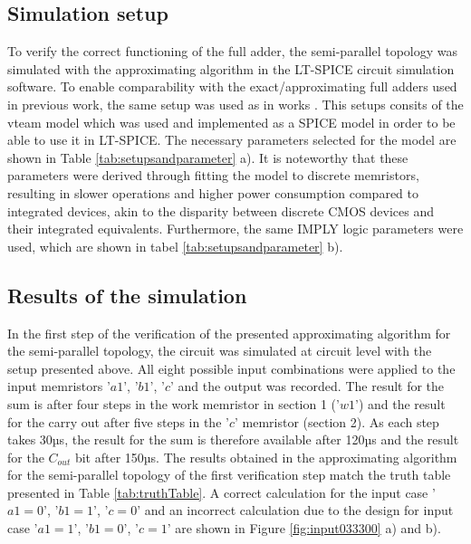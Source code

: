 \documentclass[]{IEEEtran}
\begin{document}
\subsection{Simulation setup}
To verify the correct functioning of the full adder, the semi-parallel topology was simulated with the approximating algorithm in the LT-SPICE circuit simulation software. To enable comparability with the exact/approximating full adders used in previous work, the same setup was used as in works \cite{7946813, karimi-2018, 10032497, 10305490}. This setups consits of the \gls{vteam} model \cite{7110565} which was used and implemented as a SPICE model in order to be able to use it in LT-SPICE. The necessary parameters selected for the model are shown in Table \ref{tab:setupsandparameter} a). It is noteworthy that these parameters were derived through fitting the model to discrete memristors, resulting in slower operations and higher power consumption compared to integrated devices, akin to the disparity between discrete CMOS devices and their integrated equivalents.
Furthermore, the same IMPLY logic parameters were used, which are shown in tabel \ref{tab:setupsandparameter} b).
\subsection{Results of the simulation}
In the first step of the verification of the presented approximating algorithm for the semi-parallel topology, the circuit was simulated at circuit level with the setup presented above. All eight possible input combinations were applied to the input memristors '$a1$', '$b1$', '$c$' and the output was recorded. The result for the sum is after four steps in the work memristor in section 1 ('$w1$') and the result for the carry out after five steps in the '$c$' memristor (section 2). As each step takes 30µs, the result for the sum is therefore available after 120µs and the result for the $C_{out}$ bit after 150µs. The results obtained in the approximating algorithm for the semi-parallel topology of the first verification step match the truth table presented in Table \ref{tab:truthTable}. A correct calculation for the input case '$a1 = 0$', '$b1 = 1$', '$c = 0$' and an incorrect calculation due to the design for input case '$a1 = 1$', '$b1 = 0$', '$c = 1$' are shown in Figure \ref{fig:input033300} a) and b). 
\end{document}
